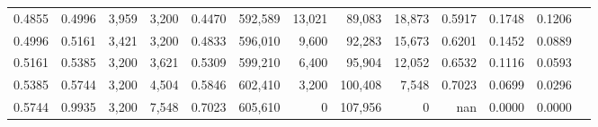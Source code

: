 \begin{tabular}{rrrrrrrrrrrrr}
0.4855 & 0.4996 &   3,959 & 3,200 &                                     0.4470 & 592,589 &  13,021 &  89,083 &  18,873 & 0.5917 & 0.1748 & 0.1206 \\
0.4996 & 0.5161 &   3,421 & 3,200 &                                     0.4833 & 596,010 &   9,600 &  92,283 &  15,673 & 0.6201 & 0.1452 & 0.0889 \\
0.5161 & 0.5385 &   3,200 & 3,621 &                                     0.5309 & 599,210 &   6,400 &  95,904 &  12,052 & 0.6532 & 0.1116 & 0.0593 \\
0.5385 & 0.5744 &   3,200 & 4,504 &                                     0.5846 & 602,410 &   3,200 & 100,408 &   7,548 & 0.7023 & 0.0699 & 0.0296 \\
0.5744 & 0.9935 &   3,200 & 7,548 &                                     0.7023 & 605,610 &       0 & 107,956 &       0 &    nan & 0.0000 & 0.0000 \\
\bottomrule
\end{tabular}
